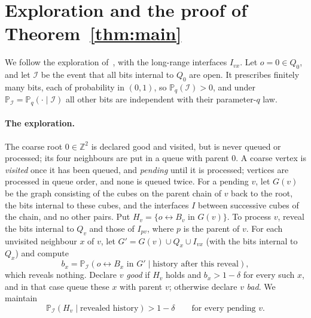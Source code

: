 \documentclass[11pt]{article}
\theoremstyle{definition}
\theoremstyle{remark}
\numberwithin{equation}{section}
\newcommand{\Z}{\mathbb Z}
\newcommand{\Pp}{\mathbb P}
\newcommand{\1}{\mathbf 1}
\newcommand{\cI}{\mathcal I}
\newcommand{\lr}{\leftrightarrow}
\begin{document}
\section{Exploration and the proof of Theorem~\ref{thm:main}}\label{sec:exploration}

We follow the exploration of~\cite[\S6]{OpenAIZ3}, with the long-range interfaces $I_{vx}$. Let
$o=0\in Q_0$, and let $\cI$ be the event that all bits internal to $Q_0$ are open. It prescribes
finitely many bits, each of probability in $(0,1)$, so $\Pp_q(\cI)>0$, and under
$\Pp_\cI=\Pp_q(\cdot\mid\cI)$ all other bits are independent with their parameter-$q$ law.

\paragraph{The exploration.} The coarse root $0\in\Z^2$ is declared good and visited, but is never queued
or processed; its four neighbours are put in a queue with parent $0$. A coarse vertex is \emph{visited} once it has been
queued, and \emph{pending} until it is processed; vertices are processed in queue order, and none is queued
twice. For a pending $v$, let $G(v)$ be the graph consisting of the cubes on the parent chain of
$v$ back to the root, the bits internal to these cubes, and the interfaces $I$ between successive
cubes of the chain, and no other pairs. Put $H_v=\{o\lr B_v\text{ in }G(v)\}$. To process $v$, reveal
the bits internal to $Q_v$ and those of $I_{pv}$, where $p$ is the parent of $v$. For each unvisited
neighbour $x$ of $v$, let $G'=G(v)\cup Q_x\cup I_{vx}$ (with the bits internal to $Q_x$) and compute
\[
b_x=\Pp_\cI(o\lr B_x\text{ in }G'\mid\text{history after this reveal}),
\]
which reveals nothing. Declare $v$ \emph{good} if $H_v$ holds and $b_x>1-\delta$ for every such $x$,
and in that case queue these $x$ with parent $v$; otherwise declare $v$ \emph{bad}. We maintain
\begin{equation}\label{eq:promise}
\Pp_\cI(H_v\mid\text{revealed history})>1-\delta\qquad\text{for every pending }v.
\end{equation}
\end{document}
